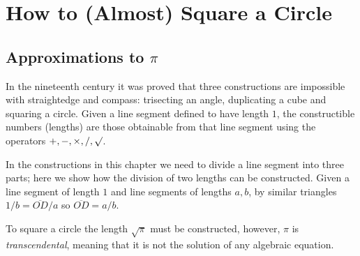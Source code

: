 
\chapter{How to (Almost) Square a Circle}

\section{Approximations to $\pi$}\label{s.square-intro}

In the nineteenth century it was proved that three constructions are impossible with straightedge and compass: trisecting an angle, duplicating a cube and squaring a circle. Given a line segment defined to have length $1$, the constructible numbers (lengths) are those obtainable from that line segment using the operators $+,-,\times,/,\surd$.

In the constructions in this chapter we need to divide a line segment into three parts; here we show how the division of two lengths can be constructed. Given a line segment of length $1$ and line segments of lengths $a,b$, by similar triangles $1/b=\overline{OD}/a$ so $\overline{OD}=a/b$.

\begin{center}
\end{center}

To square a circle the length $\sqrt{\pi}$ must be constructed, however, $\pi$ is \emph{transcendental}, meaning that it is not the solution of any algebraic equation.

